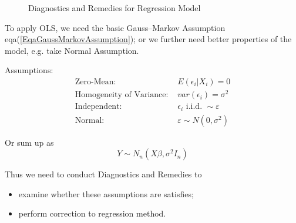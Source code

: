 \begin{figure}[htbp]
\begin{center}
    \caption{Diagnostics and Remedies for Regression Model}
    
\end{center}
\end{figure}






    To apply OLS, we need the basic Gauss–Markov Assumption eqa(\ref{EqaGaussMarkovAssumption}); or we further need better properties of the model, e.g. take Normal Assumption.
    
    Assumptions:
    \begin{equation}
        \begin{aligned}
            \text{Zero-Mean: }&E(\epsilon_i|X_i)=0 \\
            \text{Homogeneity of Variance: }&var(\epsilon_i)=\sigma^2\\
            \text{Independent: }&\epsilon_i\text{ i.i.d. }\sim \varepsilon\\
            \text{Normal: }&\varepsilon \sim N(0,\sigma^2)
        \end{aligned}
    \end{equation}
    
    Or sum up as 
    \begin{equation}
        Y\sim N_n(X\beta ,\sigma^2I_n) 
    \end{equation}
    
    
    
    Thus we need to conduct Diagnostics and Remedies to 
    \begin{itemize}[topsep=2pt,itemsep=2pt]
        \item examine whether these assumptions are satisfies;
        \item perform correction to regression method.
    \end{itemize}


